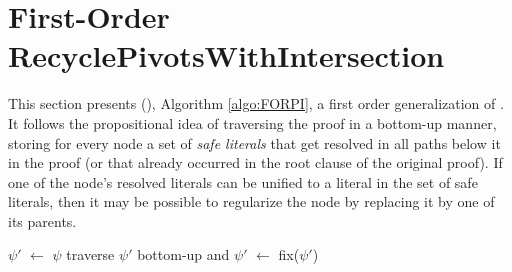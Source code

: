\section{First-Order RecyclePivotsWithIntersection}
\label{sec:FORPI}
This section presents {\FirstOrderRPI} ({\FORPI}), Algorithm \ref{algo:FORPI}, a first order generalization of {\RPI}. 
It follows the propositional idea of traversing the proof in a bottom-up manner, storing for every node a set of \emph{safe literals} that get resolved in all paths below it in the proof (or that already occurred in the root clause of the original proof). If one of the node's resolved literals can be unified to a literal in the set of safe literals, then it may be possible to regularize the node by replacing it by one of its parents. 


\newcommand{\la}{\leftarrow}


\begin{algorithm}[bt]
\begin{footnotesize}


\BlankLine

$\psi'$ $\la$ $\psi$\;
traverse $\psi'$ bottom-up and 
$\psi'$ $\la$ fix($\psi'$) \;
\;
\caption{\label{algo:FORPI} \texttt{\FORPI}}
\end{footnotesize}
\end{algorithm}





